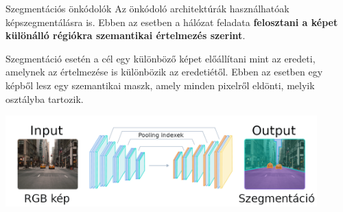 \documentclass[english, aspectratio=169]{beamer}
\begin{document}
\begin{frame}{Szegmentációs önkódolók}
	Az önkódoló architektúrák használhatóak képszegmentálásra is. Ebben az esetben a hálózat feladata \textbf{felosztani a képet különálló régiókra szemantikai értelmezés szerint}.\par\smallskip Szegmentáció esetén a cél egy különböző képet előállítani mint az eredeti, amelynek az értelmezése is különbözik az eredetiétől. Ebben az esetben egy képből lesz egy szemantikai maszk, amely minden pixelről eldönti, melyik osztályba tartozik. 
	\begin{center}
		\includegraphics[width=12cm, keepaspectratio]{images/dl_11.png}
	\end{center} 
\end{frame}
\end{document}
